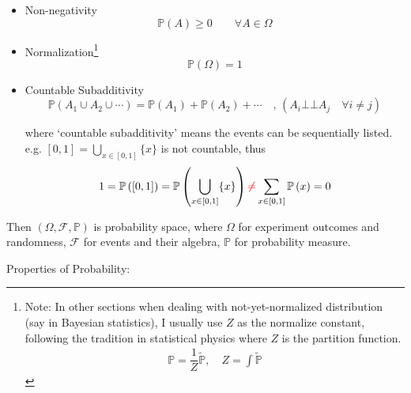 \begin{itemize}[itemsep=2pt,topsep=-2pt]
\item Non-negativity
\begin{equation}    \mathbb{P}(A)\geq 0\qquad \forall A\in\Omega    
\end{equation}
\item Normalization\footnote{Note: In other sections when dealing with not-yet-normalized distribution (say in Bayesian statistics), I usually use $ Z $ as the normalize constant, following the tradition in statistical physics where $ Z $ is the partition function.
\begin{align}
    \mathbb{P}=\dfrac{1}{Z}\tilde{\mathbb{P}},\quad Z=\int \mathbb{\tilde{P}} 
\end{align}}
\begin{equation}    \mathbb{P}(\Omega)=1    
\end{equation}




\item Countable Subadditivity
\begin{equation}    \mathbb{P}(A_1\cup A_2\cup\cdots)=\mathbb{P}(A_1)+\mathbb{P}(A_2)+\cdots\quad ,\, (A_i\bot\!\!\!\bot  A_j\quad \forall i\neq j)
\end{equation}

where `countable subadditivity' means the events can be sequentially listed. e.g. $ [0,1]=\bigcup _{x\in [0,1]}\{x\} $ is not countable, thus
\begin{align}
    1=\mathbb{P}\left( [0,1] \right)=\mathbb{P}\left( \bigcup _{x\in [0,1]}\{x\} \right)   {\color{red}\neq} \sum_{x\in[0,1]}\mathbb{P}\left( x \right) =0
\end{align}


\end{itemize}

    Then $(\Omega,\mathscr{F},\mathbb{P})$ is probability space, where $ \Omega  $ for experiment outcomes and randomness, $ \mathscr{F} $ for events and their algebra, $ \mathbb{P} $ for probability measure.

\begin{point}
        Properties of Probability:
\end{point}

